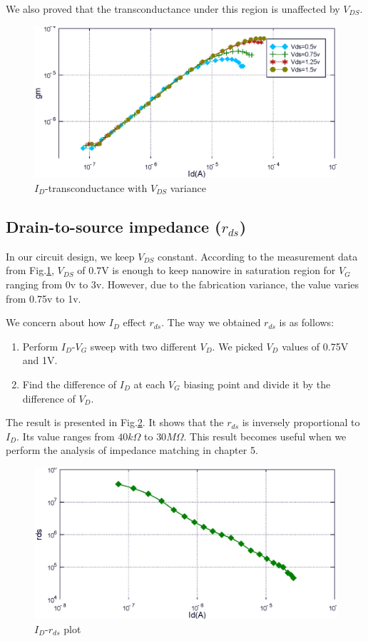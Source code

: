 We also proved that the transconductance under this region is unaffected by $V_{DS}$.

\begin{figure}[tbp]
    \centering
    \includegraphics[width=1\textwidth]{images/chapter3/pIdgbs_Vd.eps}
    \caption{$I_D$-transconductance with $V_{DS}$ variance}
    \label{fig:Idgbs_Vd}
\end{figure}

\subsection{Drain-to-source impedance ($r_{ds}$)} \label{sec:ch3rds}
In our circuit design, we keep $V_{DS}$ constant.
According to the measurement data from Fig.\ref{fig:Idgbs_Vd}, $V_{DS}$ of 0.7V is enough to keep nanowire in saturation region for $V_G$ ranging from 0v to 3v.
However, due to the fabrication variance, the value varies from 0.75v to 1v.

We concern about how $I_D$ effect $r_{ds}$.
The way we obtained $r_{ds}$ is as follows:
\begin{enumerate}
    \item Perform $I_D$-$V_G$ sweep with two different $V_D$. We picked $V_D$ values of 0.75V and 1V.
    \item Find the difference of $I_D$ at each $V_G$ biasing point and divide it by the difference of $V_D$.
\end{enumerate}
The result is presented in Fig.\ref{fig:rds}.
It shows that the $r_{ds}$ is inversely proportional to $I_D$.
Its value ranges from $40k \Omega$ to $30M \Omega$.
This result becomes useful when we perform the analysis of impedance matching in chapter 5.


\begin{figure}[tbp]
    \centering
    \includegraphics[width=1\textwidth]{images/chapter3/rds_I.eps}
    \caption{$I_D$-$r_{ds}$ plot}
    \label{fig:rds}
\end{figure}



